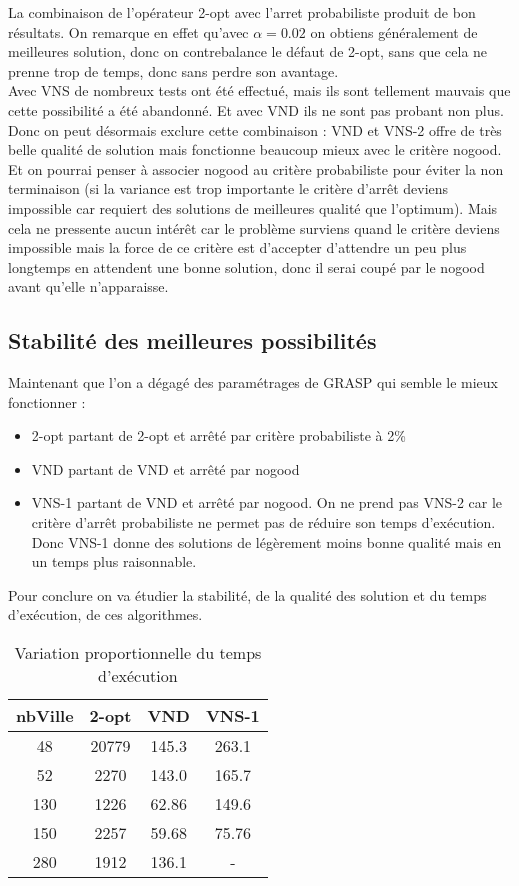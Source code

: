 \documentclass[12pt,a4paper]{article}
\begin{document}
La combinaison de l’opérateur 2-opt avec l'arret probabiliste produit de bon résultats. On remarque en effet qu'avec $\alpha = 0.02$ on obtiens généralement de meilleures solution, donc on contrebalance le défaut de 2-opt, sans que cela ne prenne trop de temps, donc sans perdre son avantage.\\

Avec VNS de nombreux tests ont été effectué, mais ils sont tellement mauvais que cette possibilité a été abandonné. Et avec VND ils ne sont pas probant non plus. Donc on peut désormais exclure cette combinaison : VND et VNS-2 offre de très belle qualité de solution mais fonctionne beaucoup mieux avec le critère nogood.\\
Et on pourrai penser à associer nogood au critère probabiliste pour éviter la non terminaison (si la variance est trop importante le critère d’arrêt deviens impossible car requiert des solutions de meilleures qualité que l'optimum). Mais cela ne pressente aucun intérêt car le problème surviens quand le critère deviens impossible mais la force de ce critère est d'accepter d'attendre un peu plus longtemps en attendent une bonne solution, donc il serai coupé par le nogood avant qu'elle n’apparaisse.\\

\subsection{Stabilité des meilleures possibilités}

Maintenant que l'on a dégagé des paramétrages de  GRASP qui semble le mieux fonctionner :
\begin{itemize}
\item
2-opt partant de 2-opt et arrêté par critère probabiliste à 2\%
\item
VND partant de VND et arrêté par nogood
\item
VNS-1 partant de VND et arrêté par nogood. On ne prend pas VNS-2 car le critère d’arrêt probabiliste ne permet pas de réduire son temps d’exécution. Donc VNS-1 donne des solutions de légèrement moins bonne qualité mais en un temps plus raisonnable.
\end{itemize}
Pour conclure on va étudier la stabilité, de la qualité des solution et du temps d’exécution, de ces algorithmes.\\

\begin{table}[!h]
\centering
\begin{tabular}{|*{4}{c|}}
  \hline
  nbVille & 2-opt & VND & VNS-1 \\
  \hline
  48 & 20779 & 145.3 & 263.1 \\
  52 & 2270 & 143.0 & 165.7 \\
  130 & 1226 & 62.86 & 149.6 \\
  150 & 2257 & 59.68 & 75.76 \\
  280 & 1912 & 136.1 & - \\
  \hline
\end{tabular}
\caption{Variation proportionnelle du temps d’exécution}
\label{varsolGRASP}
\end{table}
\end{document}
